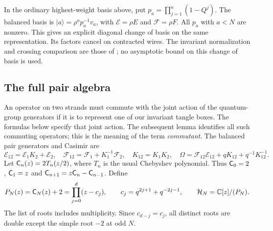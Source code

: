 \documentclass[11pt]{article}
\numberwithin{equation}{section}
\theoremstyle{definition}\newtheorem{definition}[theorem]{Definition}
\theoremstyle{remark}\newtheorem{remark}[theorem]{Remark}
\newcommand{\CC}{\mathbb C}\newcommand{\RR}{\mathbb R}\newcommand{\ZZ}{\mathbb Z}
\newcommand{\cH}{\mathcal H}\newcommand{\Bhat}{\widehat B}
\begin{document}
In the ordinary highest-weight basis above, put
$p_a=\prod_{j=1}^a(1-Q^j)$. The balanced basis is
$|a\rangle=\rho^a p_a^{-1}v_a$, with
$\mathcal E=\rho E$ and $\mathcal F=\rho F$.
All $p_a$ with $a<N$ are nonzero. This gives an explicit diagonal
change of basis on the same representation. Its factors cancel on
contracted wires. The invariant normalization and crossing comparison
are those of \cite[Theorem~10.1]{Finite}; no asymptotic bound on this
change of basis is used.

\subsection{The full pair algebra}

An operator on two strands must commute with the joint action of the quantum-group generators if it is to represent one of our invariant tangle boxes. The formulas below specify that joint action. The subsequent lemma identifies all such commuting operators; this is the meaning of the term \emph{commutant}.
The balanced pair generators and Casimir are
\begin{equation}\label{eq:pair-casimir}
 \mathcal E_{12}=\mathcal E_1K_2+\mathcal E_2,\quad
 \mathcal F_{12}=\mathcal F_1+K_1^{-1}\mathcal F_2,\quad
 K_{12}=K_1K_2,\quad
 \Omega=\mathcal F_{12}\mathcal E_{12}+qK_{12}+q^{-1}K_{12}^{-1}.
\end{equation}
Let $\mathsf C_n(z)=2T_n(z/2)$, where $T_n$ is the usual Chebyshev polynomial. Thus $\mathsf C_0=2$, $\mathsf C_1=z$ and $\mathsf C_{n+1}=z\mathsf C_n-\mathsf C_{n-1}$. Define
\begin{equation}\label{eq:hermite-algebra}
 P_N(z)=\Cheb_N(z)+2=\prod_{j=0}^{d}(z-c_j),\qquad
 c_j=q^{2j+1}+q^{-2j-1},\qquad
 \cH_N=\CC[z]/(P_N).
\end{equation}
The list of roots includes multiplicity. Since $c_{d-j}=c_j$, all distinct roots are double except the simple root $-2$ at odd $N$.
\end{document}
